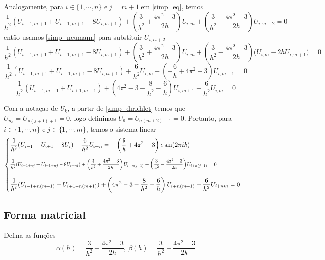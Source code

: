 \documentclass{article}
\begin{document}
    Analogamente, para $i \in \{1,\cdots,n\}$ e $j=m+1$ em \ref{simp_eq}, temos
    \[\frac{1}{h^2}(U_{i-1,m+1} + U_{i+1,m+1} - 8 U_{i,m+1}) + \left(\frac{3}{h^2} + \frac{4\pi^2 -3}{2h}\right)U_{i,m} + \left(\frac{3}{h^2} - \frac{4\pi^2 -3}{2h}\right) U_{i,m+2} = 0\]
    então usamos \ref{simp_neumann} para substituir $U_{i,m+2}$
    \[\frac{1}{h^2}(U_{i-1,m+1} + U_{i+1,m+1} - 8 U_{i,m+1}) + \left(\frac{3}{h^2} + \frac{4\pi^2 -3}{2h}\right)U_{i,m} + \left(\frac{3}{h^2} - \frac{4\pi^2 -3}{2h}\right) \Big(U_{i,m} - 2h U_{i,m+1}\Big) = 0\]
    \[\frac{1}{h^2}(U_{i-1,m+1} + U_{i+1,m+1} - 8 U_{i,m+1}) + \frac{6}{h^2} U_{i,m} + \left(-\frac{6}{h} + 4\pi^2 -3\right) U_{i,m+1} = 0\]
    \[\frac{1}{h^2}(U_{i-1,m+1} + U_{i+1,m+1}) + \left(4\pi^2 -3 -\frac{8}{h^2} - \frac{6}{h}\right)U_{i,m+1} + \frac{6}{h^2} U_{i,m} = 0\]

    Com a notação de $U_k$, a partir de \ref{simp_dirichlet} temos que $U_{nj} = U_{n(j+1)+1} = 0$, logo definimos $U_0 = U_{n(m+2)+1} = 0$. Portanto, para $i \in \{1,\cdots,n\}$ e $j \in \{1,\cdots,m\}$, temos o sistema linear
    \[\begin{cases}
        \displaystyle \frac{1}{h^2}(U_{i-1} + U_{i+1} - 8 U_{i}) + \frac{6}{h^2} U_{i+n} = -\left(\frac{6}{h} + 4\pi^2 -3\right)e\sin(2\pi ih)\\[.5cm]
        \resizebox{0.95\textwidth}{!}{$\displaystyle \frac{1}{h^2}(U_{i-1+nj} + U_{i+1+nj} - 8 U_{i+nj}) + \left(\frac{3}{h^2} + \frac{4\pi^2 -3}{2h}\right)U_{i+n(j-1)} + \left(\frac{3}{h^2} - \frac{4\pi^2 -3}{2h}\right) U_{i+n(j+1)} = 0$}\\[.5cm]
        \displaystyle \frac{1}{h^2}(U_{i-1+n(m+1)} + U_{i+1+n(m+1)}) + \left(4\pi^2 -3 -\frac{8}{h^2} - \frac{6}{h}\right)U_{i+n(m+1)} + \frac{6}{h^2} U_{i+nm} = 0
    \end{cases}\]

    \subsection{Forma matricial}
    Defina as funções
    \[\alpha(h) = \frac{3}{h^2}+\frac{4\pi^2 - 3}{2h},\ \beta(h) = \frac{3}{h^2}-\frac{4\pi^2 - 3}{2h}\]
    
\end{document}
